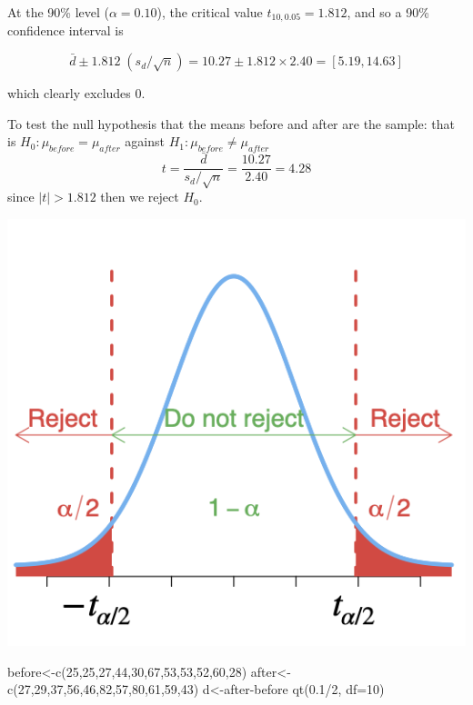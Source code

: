 \documentclass[
]{article}
\newcommand{\AttributeTok}[1]{\textcolor[rgb]{0.77,0.63,0.00}{#1}}
\newcommand{\DecValTok}[1]{\textcolor[rgb]{0.00,0.00,0.81}{#1}}
\newcommand{\FloatTok}[1]{\textcolor[rgb]{0.00,0.00,0.81}{#1}}
\newcommand{\FunctionTok}[1]{\textcolor[rgb]{0.00,0.00,0.00}{#1}}
\newcommand{\NormalTok}[1]{#1}
\newcommand{\OtherTok}[1]{\textcolor[rgb]{0.56,0.35,0.01}{#1}}
\newcommand{\SpecialCharTok}[1]{\textcolor[rgb]{0.00,0.00,0.00}{#1}}
\begin{document}
At the 90\% level (\(\alpha=0.10\)), the critical value
\(t_{10,0.05}=1.812\), and so a 90\% confidence interval is

\[\bar{d}\pm 1.812\;(s_d/\sqrt{n})=10.27\pm1.812\times 2.40=[5.19,14.63]\]

which clearly excludes 0.

To test the null hypothesis that the means before and after are the
sample: that is \(H_0:\mu_{before}=\mu_{after}\) against
\(H_1:\mu_{before}\neq\mu_{after}\)
\[t=\frac{\bar{d}}{s_d/\sqrt{n}}=\frac{10.27}{2.40}=4.28\] since
\(|t|>1.812\) then we reject \(H_0\).

\begin{center}\includegraphics[width=1\linewidth,height=1\textheight]{Ttest2} \end{center}

\begin{Highlighting}[]
\NormalTok{before}\OtherTok{\textless{}{-}}\FunctionTok{c}\NormalTok{(}\DecValTok{25}\NormalTok{,}\DecValTok{25}\NormalTok{,}\DecValTok{27}\NormalTok{,}\DecValTok{44}\NormalTok{,}\DecValTok{30}\NormalTok{,}\DecValTok{67}\NormalTok{,}\DecValTok{53}\NormalTok{,}\DecValTok{53}\NormalTok{,}\DecValTok{52}\NormalTok{,}\DecValTok{60}\NormalTok{,}\DecValTok{28}\NormalTok{)}
\NormalTok{after}\OtherTok{\textless{}{-}}\FunctionTok{c}\NormalTok{(}\DecValTok{27}\NormalTok{,}\DecValTok{29}\NormalTok{,}\DecValTok{37}\NormalTok{,}\DecValTok{56}\NormalTok{,}\DecValTok{46}\NormalTok{,}\DecValTok{82}\NormalTok{,}\DecValTok{57}\NormalTok{,}\DecValTok{80}\NormalTok{,}\DecValTok{61}\NormalTok{,}\DecValTok{59}\NormalTok{,}\DecValTok{43}\NormalTok{)}
\NormalTok{d}\OtherTok{\textless{}{-}}\NormalTok{after}\SpecialCharTok{{-}}\NormalTok{before}
\FunctionTok{qt}\NormalTok{(}\FloatTok{0.1}\SpecialCharTok{/}\DecValTok{2}\NormalTok{, }\AttributeTok{df=}\DecValTok{10}\NormalTok{)}
\end{Highlighting}
\end{document}
